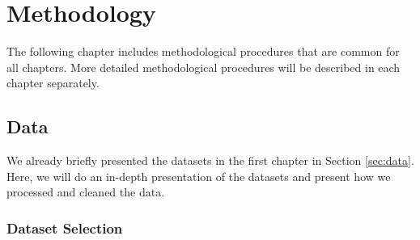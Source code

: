 
\chapter{Methodology} %
\label{chapter3} 

The following chapter includes methodological procedures that are common for all chapters.
More detailed methodological procedures will be described in each chapter separately. 

\section{Data}
\label{ssec:data}
We already briefly presented the datasets in the first chapter in Section \ref{sec:data}.
Here, we will do an in-depth presentation of the datasets and present how we processed and cleaned the data. 

\subsection{Dataset Selection}

